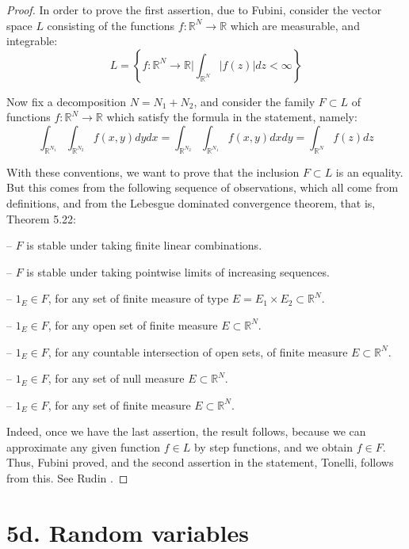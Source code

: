 \documentclass[12pt]{amsbook}
\begin{document}
\begin{proof}
In order to prove the first assertion, due to Fubini, consider the vector space $L$ consisting of the functions $f:\mathbb R^N\to\mathbb R$ which are measurable, and integrable:
$$L=\left\{f:\mathbb R^N\to\mathbb R\Big|\int_{\mathbb R^N}|f(z)|dz<\infty\right\}$$

Now fix a decomposition $N=N_1+N_2$, and consider the family $F\subset L$ of functions $f:\mathbb R^N\to\mathbb R$ which satisfy the formula in the statement, namely:
$$\int_{\mathbb R^{N_1}}\int_{\mathbb R^{N_2}}f(x,y)dydx=\int_{\mathbb R^{N_2}}\int_{\mathbb R^{N_1}}f(x,y)dxdy=\int_{\mathbb R^N}f(z)dz$$

With these conventions, we want to prove that the inclusion $F\subset L$ is an equality. But this comes from the following sequence of observations, which all come from definitions, and from the Lebesgue dominated convergence theorem, that is, Theorem 5.22:

\medskip

-- $F$ is stable under taking finite linear combinations.

\medskip

-- $F$ is stable under taking pointwise limits of increasing sequences.

\medskip

-- $1_E\in F$, for any set of finite measure of type $E=E_1\times E_2\subset\mathbb R^N$.

\medskip

-- $1_E\in F$, for any open set of finite measure $E\subset\mathbb R^N$.

\medskip

-- $1_E\in F$, for any countable intersection of open sets, of finite measure $E\subset\mathbb R^N$.

\medskip

-- $1_E\in F$, for any set of null measure $E\subset\mathbb R^N$.

\medskip

-- $1_E\in F$, for any set of finite measure $E\subset\mathbb R^N$.

\medskip

Indeed, once we have the last assertion, the result follows, because we can approximate any given function $f\in L$ by step functions, and we obtain $f\in F$. Thus, Fubini proved, and the second assertion in the statement, Tonelli, follows from this. See Rudin \cite{rud}.
\end{proof}

\section*{5d. Random variables}
\end{document}

